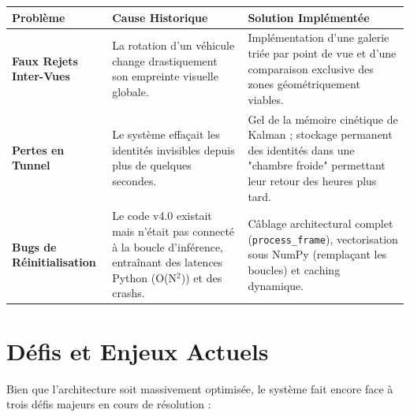 \documentclass[12pt, a4paper]{article}
\begin{document}
\vspace{0.5cm}
\begin{table}[h]
    \centering
    \renewcommand{\arraystretch}{1.5}
    \begin{tabularx}{\textwidth}{|>{\bfseries}l|X|X|}
    \hline
    \textbf{Problème} & \textbf{Cause Historique} & \textbf{Solution Implémentée} \\
    \hline
    Faux Rejets Inter-Vues & La rotation d'un véhicule change drastiquement son empreinte visuelle globale. & Implémentation d'une galerie triée par point de vue et d'une comparaison exclusive des zones géométriquement viables. \\
    \hline
    Pertes en Tunnel & Le système effaçait les identités invisibles depuis plus de quelques secondes. & Gel de la mémoire cinétique de Kalman ; stockage permanent des identités dans une "chambre froide" permettant leur retour des heures plus tard. \\
    \hline
    Bugs de Réinitialisation & Le code v4.0 existait mais n'était pas connecté à la boucle d'inférence, entraînant des latences Python (O(N$^2$)) et des crashs. & Câblage architectural complet (\texttt{process\_frame}), vectorisation sous NumPy (remplaçant les boucles) et caching dynamique. \\
    \hline
    \end{tabularx}
\end{table}
\vspace{0.5cm}

\section{Défis et Enjeux Actuels}

Bien que l'architecture soit massivement optimisée, le système fait encore face à trois défis majeurs en cours de résolution :
\end{document}
